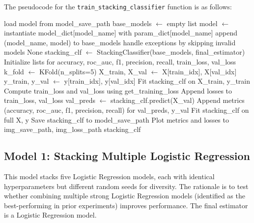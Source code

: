 The pseudocode for the \texttt{train\_stacking\_classifier} function is as follows:

\begin{algorithm}[H]
\caption{ \texttt{train\_stacking\_classifier}}
\begin{algorithmic}[1]
        \State \Return load model from model\_save\_path
    \EndIf
    \State base\_models $\gets$ empty list
        \State model $\gets$ instantiate model\_dict[model\_name] with param\_dict[model\_name]
        \State append (model\_name, model) to base\_models
        \State handle exceptions by skipping invalid models
    \EndFor
        \State \Return None
    \EndIf
    \State stacking\_clf $\gets$ StackingClassifier(base\_models, final\_estimator)
    \State Initialize lists for accuracy, roc\_auc, f1, precision, recall, train\_loss, val\_loss
    \State k\_fold $\gets$ KFold(n\_splits=5)
        \State X\_train, X\_val $\gets$ X[train\_idx], X[val\_idx]
        \State y\_train, y\_val $\gets$ y[train\_idx], y[val\_idx]
        \State Fit stacking\_clf on X\_train, y\_train
        \State Compute train\_loss and val\_loss using get\_training\_loss
        \State Append losses to train\_loss, val\_loss
        \State val\_preds $\gets$ stacking\_clf.predict(X\_val)
        \State Append metrics (accuracy, roc\_auc, f1, precision, recall) for val\_preds, y\_val
    \EndFor
    \State Fit stacking\_clf on full X, y
    \State Save stacking\_clf to model\_save\_path
    \State Plot metrics and losses to img\_save\_path, img\_loss\_path
    \State \Return stacking\_clf
\EndProcedure
\end{algorithmic}
\end{algorithm}

\subsection{Model 1: Stacking Multiple Logistic Regression}
This model stacks five Logistic Regression models, each with identical hyperparameters but different random seeds for diversity. The rationale is to test whether combining multiple strong Logistic Regression models (identified as the best-performing in prior experiments) improves performance. The final estimator is a Logistic Regression model.

